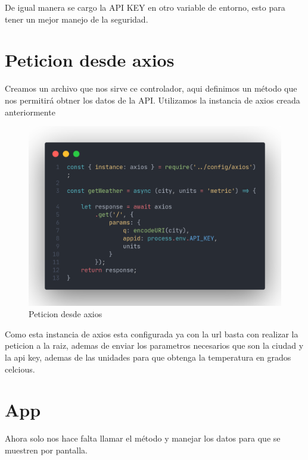 \documentclass[12pt]{article}
\begin{document}
De igual manera se cargo la API KEY en otro variable de entorno, esto para tener un mejor manejo de la seguridad.

\section{Peticion desde axios}

Creamos un archivo que nos sirve ce controlador, aqui definimos un método que nos permitirá obtner los datos de la API. Utilizamos la instancia de axios creada anteriormente

\begin{figure}[H]
    \centering
    \includegraphics[scale=.3]{assets/images/axios-request.png}
    \caption{Peticion desde axios}
\end{figure}

Como esta instancia de axios esta configurada ya con la url basta con realizar la peticion a la raiz, ademas de enviar los parametros necesarios que son la ciudad y la api key, ademas de las unidades para que obtenga la temperatura en grados celcious.

\section{App}

Ahora solo nos hace falta llamar el método y manejar los datos para que se muestren por pantalla.
\end{document}
